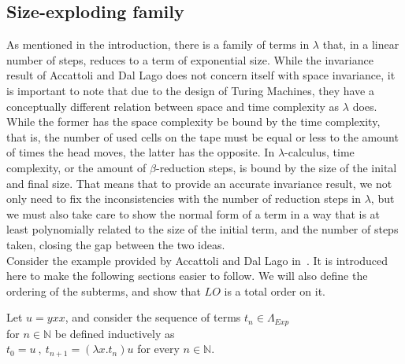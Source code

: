 \documentclass[11pt]{article}
\begin{document}
\subsection{Size-exploding family}
As mentioned in the introduction, there is a family of terms in $\lambda$ that, in a linear number of steps, reduces to a term of exponential size. While the invariance result of Accattoli and Dal Lago does not concern itself with space invariance, it is important to note that due to the design of Turing Machines, they have a conceptually different relation between space and time complexity as $\lambda$ does. While the former has the space complexity be bound by the time complexity, that is, the number of used cells on the tape must be equal or less to the amount of times the head moves, the latter has the opposite. In $\lambda$-calculus, time complexity, or the amount of $\beta$-reduction steps, is bound by the size of the inital and final size. That means that to provide an accurate invariance result, we not only need to fix the inconsistencies with the number of reduction steps in $\lambda$, but we must also take care to show the normal form of a term in a way that is at least polynomially related to the size of the initial term, and the number of steps taken, closing the gap between the two ideas.
\\ 
Consider the example provided by Accattoli and Dal Lago in~\cite{beta-invariance}. It is introduced here to make the following sections easier to follow. We will also define the ordering of the subterms, and show that $LO$ is a total order on it.
\begin{center}
  Let $u = yxx$, and consider the sequence of terms $t_{n} \in \Lambda_{Exp}$  \\ for $n \in \mathbb{N}$ be defined inductively as \\
  $t_{0} = u \ , \ t_{n + 1} = (\lambda x.t_{n})u$ for every $n \in \mathbb{N}$.
\end{center}
\end{document}
